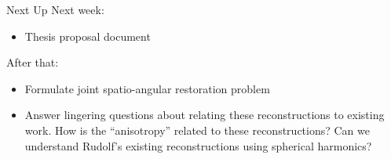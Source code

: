 \documentclass[presentation]{beamer}
\begin{document}
\begin{frame}{Next Up}
  Next week: 
  \begin{itemize}
  \item Thesis proposal document
  \end{itemize}    
  After that: 
  \begin{itemize}
  \item Formulate joint spatio-angular restoration problem
  \item Answer lingering questions about relating these reconstructions to
    existing work. How is the ``anisotropy'' related to these reconstructions?
    Can we understand Rudolf's existing reconstructions using spherical
    harmonics?
  \end{itemize}    
\end{frame}
\end{document}
